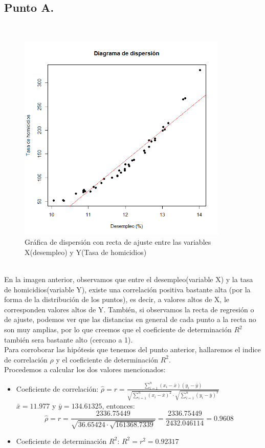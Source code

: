 \documentclass[letterpaper,12pt,onecolumn,titlepage]{article}
\begin{document}
\subsection{Punto A.}
~\\ \begin{figure}[!h]
    \begin{center}
        \includegraphics[width=10cm]{Figuras/punto2a.png}
        \caption{Gr\'{a}fica de dispersi\'{o}n con recta de ajuste entre las variables X(desempleo) y Y(Tasa de homicidios)}
        \label{fig:Densidad}
    \end{center}
\end{figure}
~\\ En la imagen anterior, observamos que entre el desempleo(variable X) y la tasa de homicidios(variable Y), existe una correlaci\'{o}n positiva bastante alta (por la forma de la distribuci\'{o}n de los puntos), es decir, a valores altos de X, le corresponden valores altos de Y. Tambi\'{e}n, si observamos la recta de regresi\'{o}n o de ajuste, podemos ver que las distancias en general de cada punto a la recta no son muy amplias, por lo que creemos que el coeficiente de determinaci\'{o}n $R^2$ tambi\'{e}n sera bastante alto (cercano a 1).
~\\ Para corroborar las hip\'{o}tesis que tenemos del punto anterior, hallaremos el indice de correlaci\'{o}n $\rho$ y el coeficiente de determinaci\'{o}n $R^2$.
~\\ Procedemos a calcular los dos valores mencionados:
\begin{itemize}
\item Coeficiente de correlaci\'{o}n: $\hat{\rho}=r=\frac{\sum\limits_{i=1}^{n}(x_{i}-\bar{x})(y_{i}-\bar{y})}{\sqrt{\sum\limits_{i=1}^{n}(x_{i}-\bar{x})^2}\cdot\sqrt{\sum\limits_{i=1}^{n}(y_{i}-\bar{y})^2}}$
~\\ $\bar{x}=11.977$ y $\bar{y}=134.61325$, entonces:
~\\ $$\hat{\rho}=r=\frac{2336.75449}{\sqrt{36.65424\cdot\sqrt{161368.7339}}}=\frac{2336.75449}{2432.046114}=0.9608$$
\item Coeficiente de determinaci\'{o}n $R^2$: $R^2=r^2=0.92317$
\end{itemize}
\end{document}
